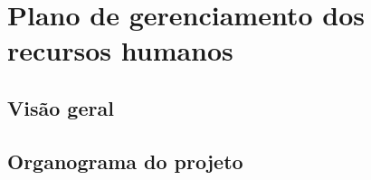 
\chapter{Plano de gerenciamento dos recursos humanos}
\label{ch:human-resource-management-plan}

\section{Visão geral}


\section{Organograma do projeto}


